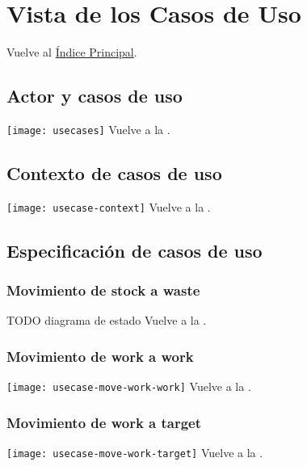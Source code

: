 \newpage{}
\section{Vista de los Casos de Uso}\label{usecasetoc}

\secttoc
Vuelve al \hyperlink{toc}{Índice Principal}.

\newpage{}
\subsection{Actor y casos de uso}
\texttt{[image: usecases]}
Vuelve a la .

\newpage{}
\subsection{Contexto de casos de uso}
\texttt{[image: usecase-context]}
Vuelve a la .

\newpage{}
\subsection{Especificación de casos de uso}

\subsubsection{Movimiento de stock a waste}
TODO diagrama de estado
Vuelve a la .

\newpage{}
\subsubsection{Movimiento de work a work}
\texttt{[image: usecase-move-work-work]}
Vuelve a la .

\newpage{}
\subsubsection{Movimiento de work a target}
\texttt{[image: usecase-move-work-target]}
Vuelve a la .


